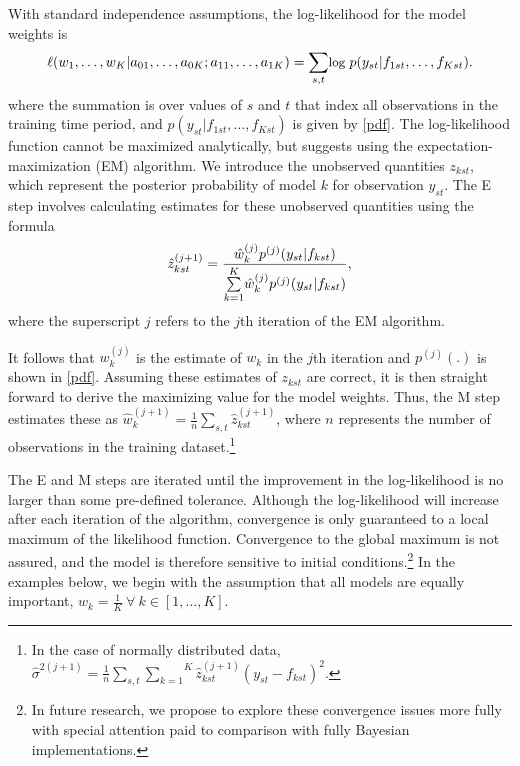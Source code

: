 \documentclass[pdftex,12pt,fullpage,oneside]{amsart}
\begin{document}
With standard independence assumptions, the log-likelihood for the
model weights is
\begin{equation}
\small
  \ell (w_1, \ldots, w_K | a_{01},  \ldots, a_{0K}; a_{11},
  \ldots, a_{1K})= \underset{s,t}{\sum}\mbox{log }p(y_{st} |
  f_{1st}, \ldots, f_{Kst}).
\end{equation}
\noindent where the summation is over values of $s$ and $t$ that index
all observations in the training time period, and $p(y_{st}|f_{1st},
\ldots, f_{Kst}) $ is given by \eqref{pdf}. The log-likelihood
function cannot be maximized analytically, but \citet{Raftery:2005}
suggests using the expectation-maximization (EM) algorithm.  We
introduce the unobserved quantities $z_{kst}$, which represent the
posterior probability of model $k$ for observation $y_{st}$.  The E
step involves calculating estimates for these unobserved quantities
using the formula
\begin{equation}
\small
\hat{z}^{(j+1)}_{kst} = \frac{\hat{w}^{(j)}_k
p^{(j)}(y_{st}|f_{kst})}{\overset{K}{\underset{k=1}{\sum}}\hat{w}^{(j)}_kp^{(j)}(y_{st}|f_{kst})},
\end{equation}
\noindent where the superscript $j$ refers to the $j$th iteration of
the EM algorithm.

It follows that $w_k^{(j)}$ is the estimate of $w_k$ in the $j$th
iteration and $p^{(j)}(.)$ is shown in \eqref{pdf}.  Assuming these
estimates of $z_{kst}$ are correct, it is then straight forward to
derive the maximizing value for the model weights. Thus, the M step
estimates these as
$\hat{w}^{(j+1)}_k=\frac{1}{n}\underset{s,t}{\sum}\hat{z}^{(j+1)}_{kst}$,
where $n$ represents the number of observations in the training
dataset.\footnote{ In the case of normally distributed data,
  $\hat{\sigma}^{2(j+1)}=\frac{1}{n}\underset{s,t}{\sum}\overset{K}{\underset{k=1}{\sum}}\hat{z}^{(j+1)}_{kst}(y_{st}-f_{kst})^2$.}


The E and M steps are iterated until the improvement in the
log-likelihood is no larger than some pre-defined tolerance.  Although
the log-likelihood will increase after each iteration of the
algorithm, convergence is only guaranteed to a local maximum of the
likelihood function.  Convergence to the global maximum is not
assured, and the model is therefore sensitive to initial
conditions.\footnote{In future research, we propose to explore these
  convergence issues more fully with special attention paid to
  comparison with fully Bayesian implementations.} In the examples
below, we begin with the assumption that all models are equally
important, $w_k = \frac{1}{K} ~ \forall ~ k \in [1, \ldots, K]$.
\end{document}
